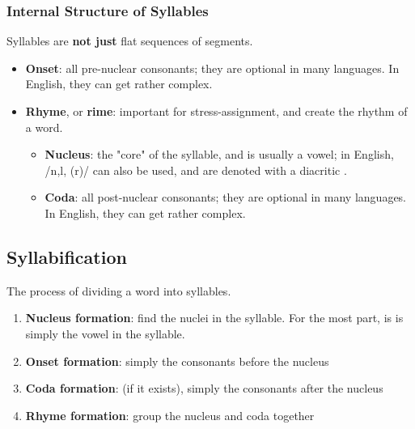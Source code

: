 \documentclass[12pt]{article}
\begin{document}
\subsubsection{Internal Structure of Syllables}

Syllables are \textbf{not just} flat sequences  of segments.
\begin{itemize}
  \item \textbf{Onset}: all pre-nuclear consonants; they are optional in many languages. In English, they can get rather complex.
  \item \textbf{Rhyme}, or \textbf{rime}: important for stress-assignment, and create the rhythm of a word.
  \begin{itemize}
    \item \textbf{Nucleus}: the "core" of the syllable, and is usually a vowel; in English, /n,l, \textturnr (\*r)/ can also be used, and are denoted with a diacritic .
    \item \textbf{Coda}: all post-nuclear consonants; they are optional in many languages. In English, they can get rather complex.
  \end{itemize}
\end{itemize}

\subsection{Syllabification}

\begin{definitionEnd}[Syllabification]
  The process of dividing a word into syllables.
\end{definitionEnd}

\begin{center} 
\end{center}

\begin{enumerate}
  \item \textbf{Nucleus formation}: find the nuclei in the syllable. For the most part, is is simply the vowel in the syllable.
  \item \textbf{Onset formation}: simply the consonants before the nucleus
  \item \textbf{Coda formation}: (if it exists), simply the consonants after the nucleus
  \item \textbf{Rhyme formation}: group the nucleus and coda together
\end{enumerate}
\end{document}

